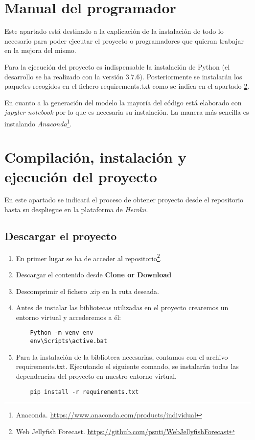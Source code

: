 \section{Manual del programador}

Este apartado está destinado a la explicación de la instalación de todo lo necesario para poder ejecutar el proyecto o programadores que quieran trabajar en la mejora del mismo.

Para la ejecución del proyecto es indispensable la instalación de Python (el desarrollo se ha realizado con la versión 3.7.6). Posteriormente se instalarán los paquetes recogidos en el fichero requirements.txt como se indica en el apartado \ref{D4}.

En cuanto a la generación del modelo la mayoría del código está elaborado con \emph{jupyter notebook} por lo que es necesaria su instalación. La manera más sencilla es instalando \emph{Anaconda}\footnote{Anaconda. \url{https://www.anaconda.com/products/individual}}.

\section{Compilación, instalación y ejecución del proyecto}\label{D4}

En este apartado se indicará el proceso de obtener proyecto desde el repositorio hasta su despliegue en la plataforma de \emph{Heroku}.

\subsection{Descargar el proyecto}\label{Descarga}

\begin{enumerate}
	\item En primer lugar se ha de acceder al repositorio\footnote{Web Jellyfish Forecast. \url{https://github.com/psnti/WebJellyfishForecast}}.
	\item Descargar el contenido desde \textbf{Clone or Download}
	\label{clone}
	\item Descomprimir el fichero .zip en la ruta deseada.
	\item Antes de instalar las bibliotecas utilizadas en el proyecto crearemos un entorno virtual y accederemos a él:
	\begin{verbatim}
	Python -m venv env
	env\Scripts\active.bat
	\end{verbatim}
	\item Para la instalación de la biblioteca necesarias, contamos con el archivo requirements.txt. Ejecutando el siguiente comando, se instalarán todas las dependencias del proyecto en  nuestro entorno virtual.
	\begin{verbatim}
	pip install -r requirements.txt
	\end{verbatim}
	
\end{enumerate}

